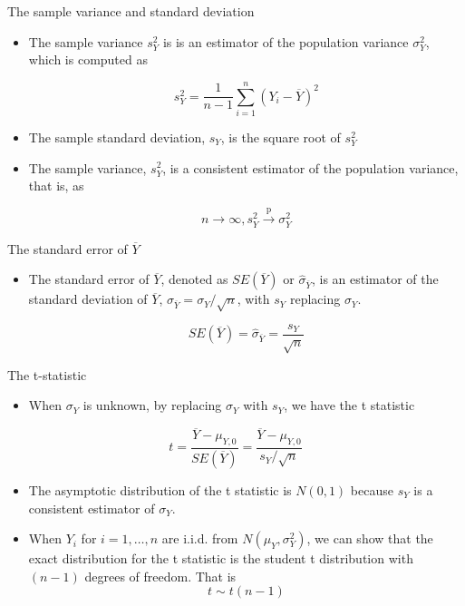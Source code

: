 \documentclass[presentation]{beamer}
\begin{document}
\begin{frame}[label={sec:org08ec69b}]{The sample variance and standard deviation}
\begin{itemize}
\item The \alert{sample variance} \(s^2_Y\) is is an estimator of the population
variance \(\sigma^2_Y\), which is computed as

\[ s^2_Y = \frac{1}{n-1}\sum^n_{i=1} (Y_i - \overline{Y})^2 \]

\item The \alert{sample standard deviation}, \(s_Y\), is the square root of \(s^2_Y\)

\item The sample variance, \(s^2_Y\), is a consistent estimator of the
population variance, that is, as 

\[ n \rightarrow \infty, s^2_Y \xrightarrow{\text{ p }} \sigma^2_Y\]
\end{itemize}
\end{frame}

\begin{frame}[label={sec:orgd86593a}]{The standard error of \(\overline{Y}\)}
\begin{itemize}
\item The standard error of \(\overline{Y}\), denoted as \(SE(\overline{Y})\) or
\(\hat{\sigma}_{\overline{Y}}\), is an estimator of the standard
deviation of \(\overline{Y}\), \(\sigma_{\overline{Y}}=\sigma_Y/\sqrt{n}\), with \(s_Y\) replacing
\(\sigma_Y\). 

\[ SE(\overline{Y}) = \hat{\sigma}_{\overline{Y}} =
  \frac{s_Y}{\sqrt{n}} \]
\end{itemize}
\end{frame}

\begin{frame}[label={sec:orgd2105ae}]{The t-statistic}
\begin{itemize}
\item When \(\sigma_Y\) is unknown, by replacing \(\sigma_Y\) with \(s_Y\), we
have the t statistic
\end{itemize}

\[ t = \frac{\overline{Y} - \mu_{Y,0}}{SE(\overline{Y})} =
  \frac{\overline{Y} - \mu_{Y,0}}{s_Y/\sqrt{n}} \] 

\begin{itemize}
\item The asymptotic distribution of the t statistic is \(N(0, 1)\) because
\(s_Y\) is a consistent estimator of \(\sigma_Y\).

\item When \(Y_i\) for \(i=1, \ldots, n\) are i.i.d. from \(N(\mu_Y,
  \sigma_Y^{2})\), we can show that the exact distribution for the t
statistic is the student t distribution with \((n-1)\) degrees of
freedom. That is
\[ t \sim t(n-1)  \]
\end{itemize}
\end{frame}
\end{document}

